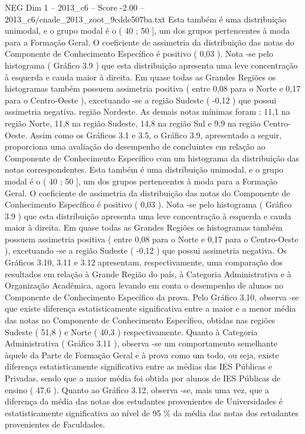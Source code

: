 \begin{textsample}{NEG Dim 1 – 2013\_c6 – Score -2.00 – 2013\_c6/enade\_2013\_zoot\_9cdde507ba.txt}
Esta também é uma distribuição unimodal, e o grupo modal é o ( 40 ; 50 ], um dos grupos pertencentes à moda para a Formação Geral.
O coeficiente de assimetria da distribuição das notas do Componente de Conhecimento Específico é positivo ( 0,03 ).
Nota -se pelo histograma ( Gráfico 3.9 ) que esta distribuição apresenta uma leve concentração à esquerda e cauda maior à direita.
Em quase todas as Grandes Regiões os histogramas também possuem assimetria positiva ( entre 0,08 para o Norte e 0,17 para o Centro-Oeste ), excetuando -se a região Sudeste ( -0,12 ) que possui assimetria negativa. região Nordeste.
As demais notas mínimas foram : 11,1 na região Norte, 11,8 na região Sudeste, 14,8 na região Sul e 9,9 na região Centro-Oeste.
Assim como os Gráficos 3.1 e 3.5, o Gráfico 3.9, apresentado a seguir, proporciona uma avaliação do desempenho de concluintes em relação ao Componente de Conhecimento Específico com um histograma da distribuição das notas correspondentes.
Esta também é uma distribuição unimodal, e o grupo modal é o ( 40 ; 50 ], um dos grupos pertencentes à moda para a Formação Geral.
O coeficiente de assimetria da distribuição das notas do Componente de Conhecimento Específico é positivo ( 0,03 ).
Nota -se pelo histograma ( Gráfico 3.9 ) que esta distribuição apresenta uma leve concentração à esquerda e cauda maior à direita.
Em quase todas as Grandes Regiões os histogramas também possuem assimetria positiva ( entre 0,08 para o Norte e 0,17 para o Centro-Oeste ), excetuando -se a região Sudeste ( -0,12 ) que possui assimetria negativa.
Os Gráficos 3.10, 3.11 e 3.12 apresentam, respectivamente, uma comparação dos resultados em relação à Grande Região do país, à Categoria Administrativa e à Organização Acadêmica, agora levando em conta o desempenho de alunos no Componente de Conhecimento Específico da prova.
Pelo Gráfico 3.10, observa -se que existe diferença estatisticamente significativa entre a maior e a menor média das notas no Componente de Conhecimento Específico, obtidas nas regiões Sudeste ( 51,8 ) e Norte ( 40,3 ) respectivamente.
Quanto à Categoria Administrativa ( Gráfico 3.11 ), observa -se um comportamento semelhante àquele da Parte de Formação Geral e à prova como um todo, ou seja, existe diferença estatisticamente significativa entre as médias das IES Públicas e Privadas, sendo que a maior média foi obtida por alunos de IES Públicas de ensino ( 47,6 ).
Quanto ao Gráfico 3.12, observa -se, mais uma vez, que a diferença da média das notas dos estudantes provenientes de Universidades é estatisticamente significativa ao nível de 95 \% da média das notas dos estudantes provenientes de Faculdades.

\end{textsample}
